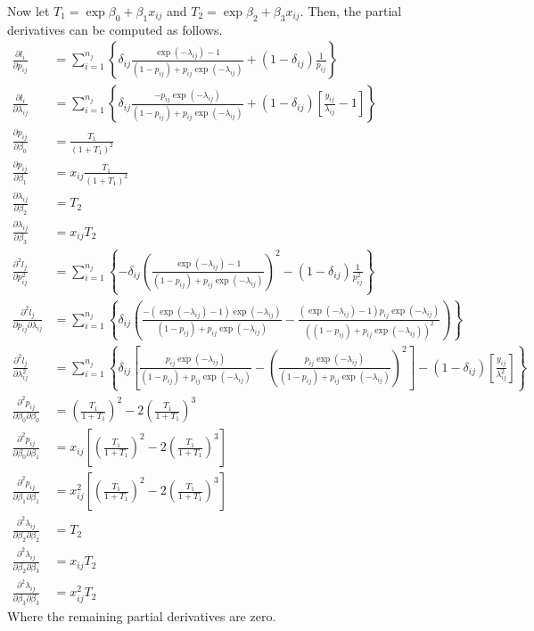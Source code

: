 \documentclass{article}\usepackage[]{graphicx}\usepackage[]{color}
\theoremstyle{plain}
\begin{document}
Now let $T_1 = \exp{\beta_0 + \beta_1 x_{ij}}$ and $T_2 = \exp{\beta_2 + \beta_3 x_{ij}}$. Then, the partial derivatives can be computed as follows.
\begin{align*}
\frac{\partial l_i}{\partial p_{ij}} &= \sum\limits_{i=1}^{n_j}\left\{ \delta_{ij} \frac{\exp(-\lambda_{ij}) - 1}{(1-p_{ij}) + p_{ij} \exp(-\lambda_{ij})} + (1-\delta_{ij}) \frac{1}{p_{ij}} \right\}  \\
\frac{\partial l_i}{\partial \lambda_{ij}} &= \sum\limits_{i=1}^{n_j}\left\{ \delta_{ij} \frac{-p_{ij}\exp(-\lambda_{ij})}{(1-p_{ij}) + p_{ij} \exp(-\lambda_{ij})} + (1-\delta_{ij}) \left[\frac{y_{ij}}{\lambda_{ij}} - 1\right] \right\} \\
\frac{\partial p_{ij}}{\partial \beta_0} &= \frac{T_1}{(1+ T_1)^2} \\
\frac{\partial p_{ij}}{\partial \beta_1} &= x_{ij} \frac{T_1}{(1+ T_1)^2} \\
\frac{\partial \lambda_{ij}}{\partial \beta_2} &= T_2\\
\frac{\partial \lambda_{ij}}{\partial \beta_3} &= x_{ij} T_2\\
\frac{\partial^2 l_j}{\partial p_{ij}^2} &= \sum\limits_{i=1}^{n_j}\left\{ -\delta_{ij} \left(\frac{\exp(-\lambda_{ij}) - 1}{(1-p_{ij}) + p_{ij} \exp(-\lambda_{ij})}\right)^2 - (1-\delta_{ij}) \frac{1}{p_{ij}^2} \right\}\\
\frac{\partial^2 l_j}{\partial p_{ij} \partial \lambda_{ij}} &= \sum\limits_{i=1}^{n_j}\left\{ \delta_{ij} \left(\frac{-(\exp(-\lambda_{ij}) - 1)\exp(-\lambda_{ij})}{(1-p_{ij}) + p_{ij} \exp(-\lambda_{ij})} - \frac{(\exp(-\lambda_{ij}) - 1)p_{ij}\exp(-\lambda_{ij})}{((1-p_{ij}) + p_{ij} \exp(-\lambda_{ij}))^2} \right)\right\}\\
\frac{\partial^2 l_j}{\partial \lambda_{ij}^2} &= \sum\limits_{i=1}^{n_j}\left\{ \delta_{ij} \left[\frac{p_{ij}\exp(-\lambda_{ij})}{(1-p_{ij}) + p_{ij} \exp(-\lambda_{ij})} -\left(\frac{p_{ij}\exp(-\lambda_{ij})}{(1-p_{ij}) + p_{ij} \exp(-\lambda_{ij})}\right)^2\right] - (1-\delta_{ij}) \left[\frac{y_{ij}}{\lambda_{ij}^2}\right] \right\}\\
\frac{\partial^2 p_{ij}}{\partial \beta_0 \partial \beta_0} &= \left( \frac{T_1}{1 + T_1}\right)^2 - 2\left(\frac{T_1}{1 + T_1}\right)^3\\
\frac{\partial^2 p_{ij}}{\partial \beta_0 \partial \beta_1} &= x_{ij}\left[ \left( \frac{T_1}{1 + T_1}\right)^2 - 2\left(\frac{T_1}{1 + T_1}\right)^3 \right]\\
\frac{\partial^2 p_{ij}}{\partial \beta_1 \partial \beta_1} &= x_{ij}^2\left[ \left( \frac{T_1}{1 + T_1}\right)^2 - 2\left(\frac{T_1}{1 + T_1}\right)^3 \right]\\
\frac{\partial^2 \lambda_{ij}}{\partial \beta_2 \partial \beta_2} &= T_2\\
\frac{\partial^2 \lambda_{ij}}{\partial \beta_2 \partial \beta_3} &= x_{ij}T_2\\
\frac{\partial^2 \lambda_{ij}}{\partial \beta_3 \partial \beta_3} &= x_{ij}^2 T_2
\end{align*}
Where the remaining partial derivatives are zero.
\end{document}
